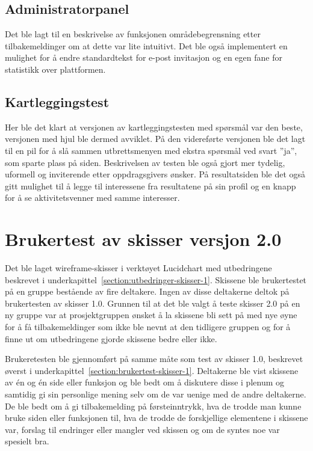  \subsection{Administratorpanel}
 Det ble lagt til en beskrivelse av funksjonen områdebegrensning etter tilbakemeldinger om at dette var lite intuitivt. Det ble også implementert en mulighet for å endre standardtekst for e-post invitasjon og en egen fane for statistikk over plattformen.
 
 \subsection{Kartleggingstest}
 
 Her ble det klart at versjonen av kartleggingstesten med spørsmål var den beste, versjonen med hjul ble dermed avviklet. På den videreførte versjonen ble det lagt til en pil for å slå sammen utbrettsmenyen med ekstra spørsmål ved svart ''ja'', som sparte plass på siden. Beskrivelsen av testen ble også gjort mer tydelig, uformell og inviterende etter oppdragsgivers ønsker. På resultatsiden ble det også gitt mulighet til å legge til interessene fra resultatene på sin profil og en knapp for å se aktivitetsvenner med samme interesser.
 
 
\section{Brukertest av skisser versjon 2.0}
 
Det ble laget wireframe-skisser i verktøyet Lucidchart med utbedringene beskrevet i underkapittel~\ref{section:utbedringer-skisser-1}. Skissene ble brukertestet på en gruppe bestående av fire deltakere. Ingen av disse deltakerne deltok på brukertesten av skisser 1.0. Grunnen til at det ble valgt å teste skisser 2.0 på en ny gruppe var at prosjektgruppen ønsket å la skissene bli sett på med nye øyne for å få tilbakemeldinger som ikke ble nevnt at den tidligere gruppen og for å finne ut om utbedringene gjorde skissene bedre eller ikke.


Brukeretesten ble gjennomført på samme måte som test av skisser 1.0, beskrevet øverst i  underkapittel~\ref{section:brukertest-skisser-1}. Deltakerne ble vist skissene av én og én side eller funksjon og ble bedt om å diskutere disse i plenum og samtidig gi sin personlige mening selv om de var uenige med de andre deltakerne. De ble bedt om å gi tilbakemelding på førsteinntrykk, hva de trodde man kunne bruke siden eller funksjonen til, hva de trodde de forskjellige elementene i skissene var, forslag til endringer eller mangler ved skissen og om de syntes noe var spesielt bra.

